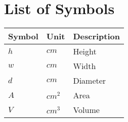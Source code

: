 \clearpage
\chapter*{List of Symbols}


\begin{tabular}{lll}
    Symbol & Unit & Description\\
    \hline
    $h$     & $cm$      & Height\\
    $w$     & $cm$      & Width\\
    $d$     & $cm$      & Diameter\\
    $A$     & $cm^2$    & Area\\
    $V$     & $cm^3$    & Volume
\end{tabular}

